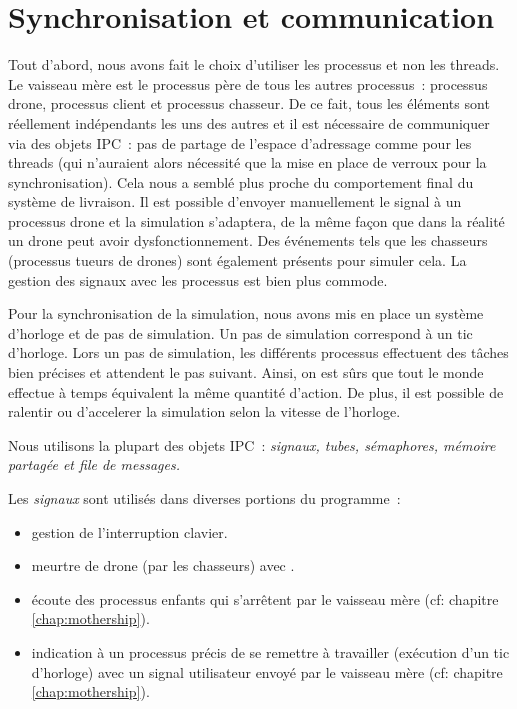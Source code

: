 \section{Synchronisation et communication}

Tout d'abord, nous avons fait le choix d'utiliser les processus et non les threads.
Le vaisseau mère est le processus père de tous les autres processus : processus drone, processus client et processus chasseur.
De ce fait, tous les éléments sont réellement indépendants les uns des autres et il est nécessaire de communiquer via
des objets IPC : pas de partage de l'espace d'adressage comme pour les threads (qui n'auraient alors nécessité que
la mise en place de verroux pour la synchronisation). Cela nous a semblé plus proche
du comportement final du système de livraison. Il est possible d'envoyer manuellement le signal  à un processus
drone et la simulation s'adaptera, de la même façon que dans la réalité un drone peut avoir dysfonctionnement.
Des événements tels que les chasseurs (processus tueurs de drones) sont également présents pour simuler cela.
La gestion des signaux avec les processus est bien plus commode.

Pour la synchronisation de la simulation, nous avons mis en place un système d'horloge et de pas de simulation. Un pas
de simulation correspond à un tic d'horloge. Lors un pas de simulation, les différents processus effectuent des tâches
bien précises et attendent le pas suivant. Ainsi, on est sûrs que tout le monde effectue à temps équivalent la même
quantité d'action. De plus, il est possible de ralentir ou d'accelerer la simulation selon la vitesse de l'horloge.

Nous utilisons la plupart des objets IPC : \emph{signaux, tubes, sémaphores, mémoire partagée et file de messages.}

Les \emph{signaux} sont utilisés dans diverses portions du programme :
\begin{itemize}
    \item gestion de l'interruption clavier.
    \item meurtre de drone (par les chasseurs) avec .
    \item écoute des processus enfants qui s'arrêtent par le vaisseau mère (cf: chapitre \ref{chap:mothership}).
    \item indication à un processus précis de se remettre à travailler (exécution d'un tic d'horloge) avec un signal utilisateur
        envoyé par le vaisseau mère (cf: chapitre \ref{chap:mothership}).
\end{itemize}

